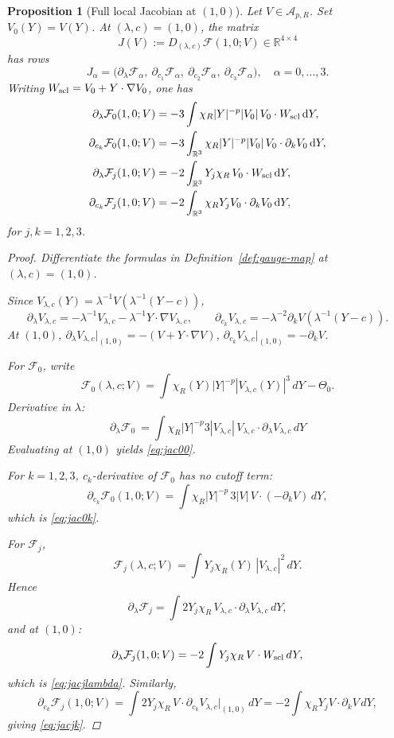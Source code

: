 \documentclass[11pt]{amsart}
\theoremstyle{plain}
\newtheorem{proposition}[theorem]{Proposition}
\theoremstyle{definition}
\theoremstyle{remark}
\newcommand{\dd}{\mathrm d}
\newcommand{\RR}{\mathbb R}
\newcommand{\nn}{\nabla}
\begin{document}
\begin{proposition}[Full local Jacobian at \((1,0)\)]\label{prop:full-jacobian}
Let \(V\in\mathcal A_{p,R}\).
Set \(V_0(Y)=V(Y)\).
At \((\lambda,c)=(1,0)\), the matrix
\[
J(V):=D_{(\lambda,c)}\mathcal F(1,0;V)\in \RR^{4\times4}
\]
has rows
\[
J_\alpha=\bigl(\partial_\lambda \mathcal F_\alpha,\ \partial_{c_1}\mathcal F_\alpha,\ 
\partial_{c_2}\mathcal F_\alpha,\ \partial_{c_3}\mathcal F_\alpha\bigr),\quad \alpha=0,\dots,3.
\]
Writing \(W_{\rm scl}=V_0+Y\cdot\nn V_0\), one has
\begin{align}
\partial_\lambda \mathcal F_0(1,0;V)
&=
-3\int\chi_R|Y|^{-p}|V_0|\,V_0\cdot W_{\rm scl}\,\dd Y,\label{eq:jac00}\\
\partial_{c_k}\mathcal F_0(1,0;V)
&=-3\int_{\RR^3}\chi_R |Y|^{-p}|V_0|\,V_0\cdot\partial_kV_0\,\dd Y,\label{eq:jac0k}\\
\partial_\lambda \mathcal F_j(1,0;V)
&=-2\int_{\RR^3}Y_j\chi_R\,V_0\cdot W_{\rm scl}\,\dd Y,\label{eq:jacjlambda}\\
\partial_{c_k}\mathcal F_j(1,0;V)
&=-2\int_{\RR^3}\chi_R Y_j V_0\cdot\partial_kV_0\,\dd Y,\label{eq:jacjk}
\end{align}
for \(j,k=1,2,3\).
\begin{proof}
Differentiate the formulas in Definition~\ref{def:gauge-map} at \((\lambda,c)=(1,0)\).

Since \(V_{\lambda,c}(Y)=\lambda^{-1}V(\lambda^{-1}(Y-c))\),
\[
\partial_\lambda V_{\lambda,c}
 =-\lambda^{-1}V_{\lambda,c}-\lambda^{-1}Y\cdot\nabla V_{\lambda,c},\qquad
\partial_{c_k}V_{\lambda,c}=-\lambda^{-2}\partial_kV(\lambda^{-1}(Y-c)).
\]
At \((1,0)\), \(\partial_\lambda V_{\lambda,c}|_{(1,0)}=-(V+Y\cdot\nabla V)\),
\(\partial_{c_k}V_{\lambda,c}|_{(1,0)}=-\partial_kV\).

For \(\mathcal F_0\), write
\[
\mathcal F_0(\lambda,c;V)=\int \chi_R(Y)|Y|^{-p}|V_{\lambda,c}(Y)|^3\,dY-\Theta_0.
\]
Derivative in \(\lambda\):
\[
\partial_\lambda \mathcal F_0
\ =\int\chi_R|Y|^{-p}3|V_{\lambda,c}|\,V_{\lambda,c}\cdot\partial_\lambda V_{\lambda,c}\,dY
\]
Evaluating at \((1,0)\) yields \eqref{eq:jac00}.

For \(k=1,2,3\), \(c_k\)-derivative of \(\mathcal F_0\) has no cutoff term:
\[
\partial_{c_k}\mathcal F_0(1,0;V)
=\int \chi_R|Y|^{-p}\,3|V|\,V\cdot(-\partial_kV)\,dY,
\]
which is \eqref{eq:jac0k}.

For \(\mathcal F_j\),
\[
\mathcal F_j(\lambda,c;V)=\int Y_j\chi_R(Y)\,|V_{\lambda,c}|^2\,dY.
\]
Hence
\[
\partial_\lambda \mathcal F_j
=\int 2Y_j\chi_R\,V_{\lambda,c}\cdot\partial_\lambda V_{\lambda,c}\,dY,
\]
and at \((1,0)\):
\[
\partial_\lambda \mathcal F_j(1,0;V)
=-2\int Y_j\chi_R\,V\cdot W_{\rm scl}\,dY,
\]
which is \eqref{eq:jacjlambda}. Similarly,
\[
\partial_{c_k}\mathcal F_j(1,0;V)
=\int 2Y_j\chi_R\,V\cdot\partial_{c_k}V_{\lambda,c}\big|_{(1,0)}\,dY
=-2\int \chi_RY_jV\cdot\partial_kV\,dY,
\]
giving \eqref{eq:jacjk}.
\end{proof}
\end{proposition}
\end{document}
